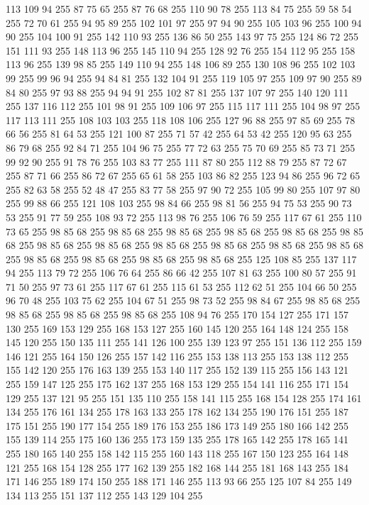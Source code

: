 113 109 94 255 87 75 65 255 87 76 68 255 110 90 78 255 113 84 75 255 59 58 54 255 72 70 61 255 94 95 89 255 102 101 97 255 97 94 90 255 105 103 96 255 100 94 90 255 104 100 91 255 142 110 93 255 136 86 50 255 143 97 75 255 124 86 72 255 151 111 93 255 148 113 96 255 145 110 94 255 128 92 76 255 154 112 95 255 158 113 96 255 139 98 85 255 149 110 94 255 148 106 89 255 130 108 96 255 102 103 99 255 99 96 94 255 94 84 81 255 132 104 91 255 119 105 97 255 109 97 90 255 89 84 80 255 97 93 88 255 94 94 91 255 102 87 81 255 137 107 97 255 140 120 111 255 137 116 112 255 101 98 91 255 109 106 97 255 115 117 111 255 104 98 97 255 117 113 111 255 108 103 103 255 118 108 106 255 127 96 88 255 97 85 69 255 78 66 56 255 81 64 53 255 121 100 87 255 71 57 42 255 64 53 42 255 120 95 63 255 86 79 68 255 92 84 71 255 104 96 75 255 77 72 63 255 75 70 69 255 85 73 71 255 99 92 90 255 91 78 76 255 103 83 77 255
111 87 80 255 112 88 79 255 87 72 67 255 87 71 66 255 86 72 67 255 65 61 58 255 103 86 82 255 123 94 86 255 96 72 65 255 82 63 58 255 52 48 47 255 83 77 58 255 97 90 72 255 105 99 80 255 107 97 80 255 99 88 66 255 121 108 103 255 98 84 66 255 98 81 56 255 94 75 53 255 90 73 53 255 91 77 59 255 108 93 72 255 113 98 76 255 106 76 59 255 117 67 61 255 110 73 65 255 98 85 68 255 98 85 68 255 98 85 68 255 98 85 68 255 98 85 68 255 98 85 68 255 98 85 68 255 98 85 68 255 98 85 68 255 98 85 68 255 98 85 68 255 98 85 68 255 98 85 68 255 98 85 68 255 98 85 68 255 98 85 68 255 125 108 85 255 137 117 94 255 113 79 72 255 106 76 64 255 86 66 42 255 107 81 63 255 100 80 57 255 91 71 50 255 97 73 61 255 117 67 61 255 115 61 53 255 112 62 51 255 104 66 50 255 96 70 48 255 103 75 62 255 104 67 51 255 98 73 52 255 98 84 67 255 98 85 68 255 98 85 68 255 98 85 68 255
98 85 68 255 108 94 76 255 170 154 127 255 171 157 130 255 169 153 129 255 168 153 127 255 160 145 120 255 164 148 124 255 158 145 120 255 150 135 111 255 141 126 100 255 139 123 97 255 151 136 112 255 159 146 121 255 164 150 126 255 157 142 116 255 153 138 113 255 153 138 112 255 155 142 120 255 176 163 139 255 153 140 117 255 152 139 115 255 156 143 121 255 159 147 125 255 175 162 137 255 168 153 129 255 154 141 116 255 171 154 129 255 137 121 95 255 151 135 110 255 158 141 115 255 168 154 128 255 174 161 134 255 176 161 134 255 178 163 133 255 178 162 134 255 190 176 151 255 187 175 151 255 190 177 154 255 189 176 153 255 186 173 149 255 180 166 142 255 155 139 114 255 175 160 136 255 173 159 135 255 178 165 142 255 178 165 141 255 180 165 140 255 158 142 115 255 160 143 118 255 167 150 123 255 164 148 121 255 168 154 128 255 177 162 139 255 182 168 144 255 181 168 143 255 184 171 146 255 189 174 150 255 188 171 146 255 113 93 66 255 125 107 84 255 149 134 113 255 151 137 112 255 143 129 104 255

